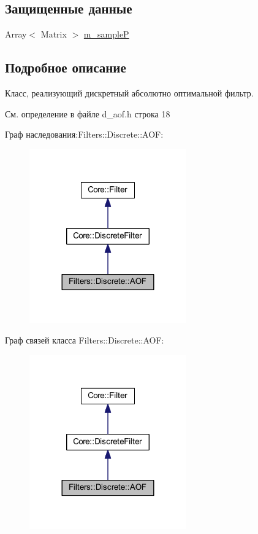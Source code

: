 \subsection*{Защищенные данные}
\begin{DoxyCompactItemize}
\item 
Array$<$ Matrix $>$ \hyperlink{class_filters_1_1_discrete_1_1_a_o_f_aef55ce0cf7129bb7090f8e470bcfbc1f}{m\+\_\+sampleP}
\end{DoxyCompactItemize}


\subsection{Подробное описание}
Класс, реализующий дискретный абсолютно оптимальной фильтр. 

См. определение в файле d\+\_\+aof.\+h строка 18



Граф наследования\+:Filters\+:\+:Discrete\+:\+:A\+OF\+:\nopagebreak
\begin{figure}[H]
\begin{center}
\leavevmode
\includegraphics[width=192pt]{class_filters_1_1_discrete_1_1_a_o_f__inherit__graph}
\end{center}
\end{figure}


Граф связей класса Filters\+:\+:Discrete\+:\+:A\+OF\+:\nopagebreak
\begin{figure}[H]
\begin{center}
\leavevmode
\includegraphics[width=192pt]{class_filters_1_1_discrete_1_1_a_o_f__coll__graph}
\end{center}
\end{figure}


